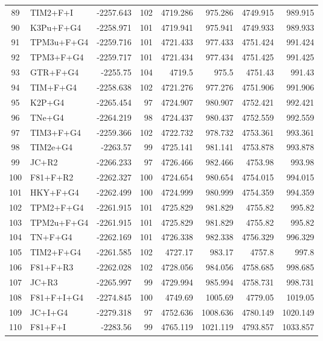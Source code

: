 \documentclass[12pt]{article}
\begin{document}
\begin{longtable}{clrrrrrr}
	89 & TIM2+F+I & -2257.643 & 102 & 4719.286 & 975.286 & 4749.915 & 989.915 \\ 
	90 & K3Pu+F+G4 & -2258.971 & 101 & 4719.941 & 975.941 & 4749.933 & 989.933 \\ 
	91 & TPM3u+F+G4 & -2259.716 & 101 & 4721.433 & 977.433 & 4751.424 & 991.424 \\ 
	92 & TPM3+F+G4 & -2259.717 & 101 & 4721.434 & 977.434 & 4751.425 & 991.425 \\ 
	93 & GTR+F+G4 & -2255.75 & 104 & 4719.5 & 975.5 & 4751.43 & 991.43 \\ 
	94 & TIM+F+G4 & -2258.638 & 102 & 4721.276 & 977.276 & 4751.906 & 991.906 \\ 
	95 & K2P+G4 & -2265.454 & 97 & 4724.907 & 980.907 & 4752.421 & 992.421 \\ 
	96 & TNe+G4 & -2264.219 & 98 & 4724.437 & 980.437 & 4752.559 & 992.559 \\ 
	97 & TIM3+F+G4 & -2259.366 & 102 & 4722.732 & 978.732 & 4753.361 & 993.361 \\ 
	98 & TIM2e+G4 & -2263.57 & 99 & 4725.141 & 981.141 & 4753.878 & 993.878 \\ 
	99 & JC+R2 & -2266.233 & 97 & 4726.466 & 982.466 & 4753.98 & 993.98 \\ 
	100 & F81+F+R2 & -2262.327 & 100 & 4724.654 & 980.654 & 4754.015 & 994.015 \\ 
	101 & HKY+F+G4 & -2262.499 & 100 & 4724.999 & 980.999 & 4754.359 & 994.359 \\ 
	102 & TPM2+F+G4 & -2261.915 & 101 & 4725.829 & 981.829 & 4755.82 & 995.82 \\ 
	103 & TPM2u+F+G4 & -2261.915 & 101 & 4725.829 & 981.829 & 4755.82 & 995.82 \\ 
	104 & TN+F+G4 & -2262.169 & 101 & 4726.338 & 982.338 & 4756.329 & 996.329 \\ 
	105 & TIM2+F+G4 & -2261.585 & 102 & 4727.17 & 983.17 & 4757.8 & 997.8 \\ 
	106 & F81+F+R3 & -2262.028 & 102 & 4728.056 & 984.056 & 4758.685 & 998.685 \\ 
	107 & JC+R3 & -2265.997 & 99 & 4729.994 & 985.994 & 4758.731 & 998.731 \\ 
	108 & F81+F+I+G4 & -2274.845 & 100 & 4749.69 & 1005.69 & 4779.05 & 1019.05 \\ 
	109 & JC+I+G4 & -2279.318 & 97 & 4752.636 & 1008.636 & 4780.149 & 1020.149 \\ 
	110 & F81+F+I & -2283.56 & 99 & 4765.119 & 1021.119 & 4793.857 & 1033.857 \\ 

\end{longtable}
\end{document}
